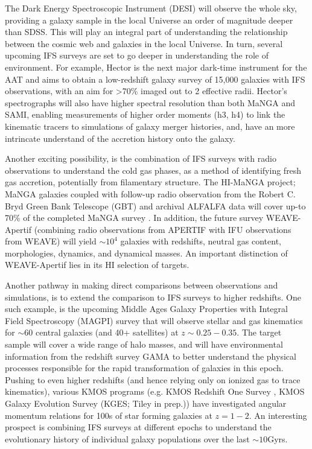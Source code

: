 The Dark Energy Spectroscopic Instrument (DESI) will observe the whole sky, providing a galaxy sample in the local Universe an order of magnitude deeper than SDSS. This will play an integral part of understanding the relationship between the cosmic web and galaxies in the local Universe. In turn, several upcoming IFS surveys are set to go deeper in understanding the role of environment. For example, Hector is the next major dark-time instrument for the AAT and aims to obtain a low-redshift galaxy survey of 15,000 galaxies with IFS observations, with an aim for >70\% imaged out to 2 effective radii. Hector's spectrographs will also have higher spectral resolution than both MaNGA and SAMI, enabling measurements of higher order moments (h3, h4) to link the kinematic tracers to simulations of galaxy merger histories, and, have an more intrincate understand of the accretion history onto the galaxy. 

Another exciting possibility, is the combination of IFS surveys with radio observations to understand the cold gas phases, as a method of identifying fresh gas accretion, potentially from filamentary structure. The HI-MaNGA project; MaNGA galaxies coupled with follow-up radio observation from the Robert C. Bryd Green Bank Telescope (GBT) and archival ALFALFA data will cover up-to 70\% of the completed MaNGA survey \citet{himanga}. In addition, the future survey WEAVE-Apertif (combining radio observations from APERTIF with IFU observations from WEAVE) will yield $\sim10^4$ galaxies with redshifts, neutral gas content, morphologies, dynamics, and dynamical masses. An important distinction of WEAVE-Apertif lies in its HI selection of targets. 

Another pathway in making direct comparisons between observations and simulations, is to extend the comparison to IFS surveys to higher redshifts. One such example, is the upcoming Middle Ages Galaxy Properties with Integral Field Spectroscopy (MAGPI) survey that will observe stellar and gas kinematics for $\sim 60$ central galaxies (and 40+ satellites) at $z\sim0.25-0.35$. The target sample will cover a wide range of halo masses, and will have environmental information from the redshift survey GAMA to better understand the physical processes responsible for the rapid transformation of galaxies in this epoch. Pushing to even higher redshifts (and hence relying only on ionized gas to trace kinematics), various KMOS programs (e.g. KMOS Redshift One Survey \citep[KROSS;][]{stott2016}, KMOS Galaxy Evolution Survey (KGES; Tiley in prep.)) have investigated angular momentum relations for 100s of star forming galaxies at $z=1-2$. An interesting prospect is combining IFS surveys at different epochs \citep[e.g.][]{tiley2019} to understand the evolutionary history of individual galaxy populations over the last $\sim10$Gyrs.

